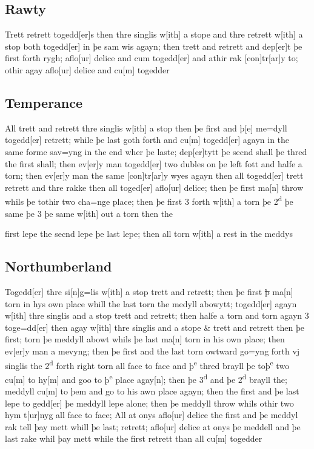 \documentclass[12pt,letter]{article} %
\newcommand{\srcpg}[1]{
    \noindent{
        \color{Gray}{\rule[0.5ex]{\linewidth}{1pt}~#1} 
    
    }
}
\begin{document}
\subsection{Rawty}
Trett retrett togedd{[}er{]}s then thre singlis w{[}ith{]} a stope and
thre retrett w{[}ith{]} a stop both togedd{[}er{]} in þe sam wis agayn;
then trett and retrett and dep{[}er{]}t þe first forth rygh;
aflo{[}ur{]} delice and cum togedd{[}er{]} and athir rak
{[}con{]}tr{[}ar{]}y to; othir agay aflo{[}ur{]} delice and cu{[}m{]}
togedder

\subsection{Temperance}
\srcpg{70} All trett and retrett thre singlis w{[}ith{]} a stop then þe
first and þ{[}e{]} me=dyll togedd{[}er{]} retrett; while þe last goth
forth and cu{[}m{]} togedd{[}er{]} agayn in the same forme sav=yng in
the end wher þe laste; dep{[}er{]}tytt þe secnd shall þe thred the first
shall; then ev{[}er{]}y man togedd{[}er{]} two dubles on þe left fott
and halfe a torn; then ev{[}er{]}y man the same {[}con{]}tr{[}ar{]}y
wyes agayn then all togedd{[}er{]} trett retrett and thre rakke then all
toged{[}er{]} aflo{[}ur{]} delice; then þe first ma{[}n{]} throw whils
þe tothir two cha=nge place; then þe first 3 forth w{[}ith{]} a torn þe
2\textsuperscript{d} þe same þe 3 þe same w{[}ith{]} out a torn then the
\srcpg{71} first lepe the secnd lepe þe last lepe; then all torn
w{[}ith{]} a rest in the meddys

\subsection{Northumberland}
Togedd{[}er{]} thre si{[}n{]}g=lis w{[}ith{]} a stop trett and retrett;
then þe first \sout{þ} ma{[}n{]} torn in hys own place whill the last
torn the medyll abowytt; togedd{[}er{]} agayn w{[}ith{]} thre singlis
and a stop trett and retrett; then halfe a torn and torn agayn 3
toge=dd{[}er{]} then agay w{[}ith{]} thre singlis and a stope \& trett
and retrett then þe first; torn þe meddyll abowt whils þe last ma{[}n{]}
torn in his own place; then ev{[}er{]}y man a mevyng; then þe first and
the last torn owtward go=yng forth vj singlis the 2\textsuperscript{d}
forth \srcpg{72} right torn all face to face and þ\textsuperscript{e}
thred brayll þe toþ\textsuperscript{e} two cu{[}m{]} to hy{[}m{]} and
goo to þ\textsuperscript{e} place agay{[}n{]}; then þe
3\textsuperscript{d} and þe 2\textsuperscript{d} brayll the; meddyll
cu{[}m{]} to þem and go to his awn place agayn; then the first and þe
last lepe to gedd{[}er{]} þe meddyll lepe alone; then þe meddyll throw
whils othir two hym t{[}ur{]}nyg all face to face; All at onys
aflo{[}ur{]} delice the first and þe meddyl rak tell þay mett whill þe
last; retrett; aflo{[}ur{]} delice at onys þe meddell and þe last rake
whil þay mett while the first retrett than all cu{[}m{]} togedder
\end{document}
